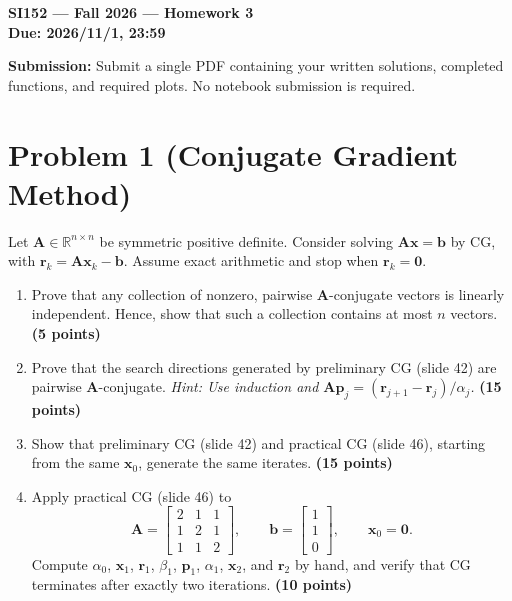 \documentclass[11pt,a4paper]{article}
\begin{document}
\begin{center}
    {\Large\bfseries SI152 --- Fall 2026 --- Homework 3}\\[0.6em]
    \textbf{Due: 2026/11/1, 23:59}
\end{center}

\textbf{Submission:} Submit a single PDF containing your written
solutions, completed functions, and required plots.
No notebook submission is required.


\section*{Problem 1 (Conjugate Gradient Method)}

Let $\mathbf{A}\in\mathbb{R}^{n\times n}$ be symmetric positive
definite. Consider solving $\mathbf{A}\mathbf{x}=\mathbf{b}$ by CG,
with $\mathbf{r}_k=\mathbf{A}\mathbf{x}_k-\mathbf{b}$.
Assume exact arithmetic and stop when $\mathbf{r}_k=\mathbf{0}$.

\begin{enumerate}
    \item Prove that any collection of nonzero, pairwise
    $\mathbf{A}$-conjugate vectors is linearly independent.
    Hence, show that such a collection contains at most $n$ vectors.
    \textbf{(5 points)}

    \item Prove that the search directions generated by preliminary
    CG (slide 42) are pairwise $\mathbf{A}$-conjugate. 
    \textit{Hint: Use induction and
    $\mathbf{A}\mathbf{p}_j
    =(\mathbf{r}_{j+1}-\mathbf{r}_j)/\alpha_j$.}
    \textbf{(15 points)}

    \item Show that preliminary CG (slide 42) and practical CG
    (slide 46), starting from the same $\mathbf{x}_0$, generate
    the same iterates.
    \textbf{(15 points)}

    \item Apply practical CG (slide 46) to
    \[
        \mathbf{A}=
        \begin{bmatrix}
            2&1&1\\
            1&2&1\\
            1&1&2
        \end{bmatrix},
        \qquad
        \mathbf{b}=\begin{bmatrix}1\\1\\0\end{bmatrix},
        \qquad
        \mathbf{x}_0=\mathbf{0}.
    \]
    Compute $\alpha_0$, $\mathbf{x}_1$, $\mathbf{r}_1$,
    $\beta_1$, $\mathbf{p}_1$, $\alpha_1$, $\mathbf{x}_2$,
    and $\mathbf{r}_2$ by hand, and verify that CG terminates
    after exactly two iterations.
    \textbf{(10 points)}
\end{enumerate}
\end{document}
